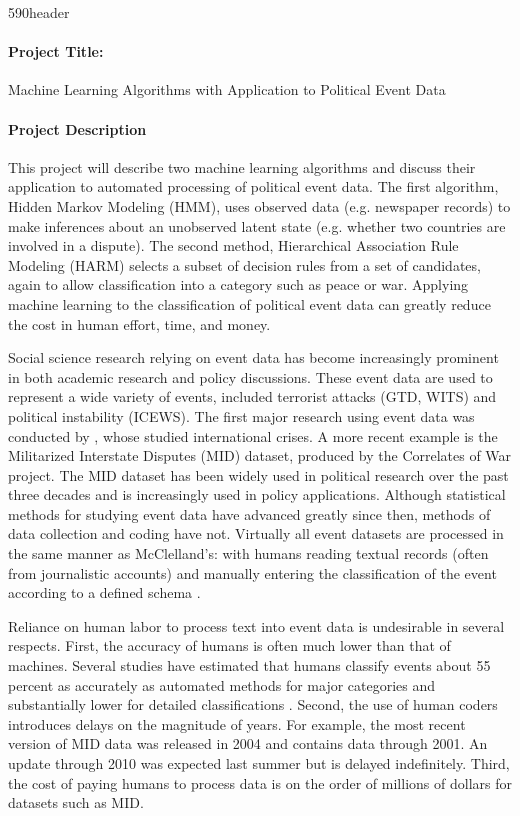 \documentclass[12pt,letterpaper]{article}
\begin{document}
\cps590header

\paragraph{Project Title:} Machine Learning Algorithms with Application to Political Event Data

\paragraph{Project Description} This project will describe two machine learning algorithms and discuss their application to automated processing of political event data. The first algorithm, Hidden Markov Modeling (HMM), uses observed data (e.g. newspaper records) to make inferences about an unobserved latent state (e.g. whether two countries are involved in a dispute). The second method, Hierarchical Association Rule Modeling (HARM) selects a subset of decision rules from a set of candidates, again to allow classification into a category such as peace or war. Applying machine learning to the classification of political event data can greatly reduce the cost in human effort, time, and money. 

Social science research relying on event data has become increasingly prominent in both academic research and policy discussions. These event data are used to represent a wide variety of events, included terrorist attacks (GTD, WITS) and political instability (ICEWS). The first major research using event data was conducted by \citet{mcclelland1961}, whose studied international crises. A more recent example is the Militarized Interstate Disputes (MID) dataset, produced by the Correlates of War project. The MID dataset has been widely used in political research over the past three decades and is increasingly used in policy applications. Although statistical methods for studying event data have advanced greatly since then, methods of data collection and coding have not. Virtually all event datasets are processed in the same manner as McClelland's: with humans reading textual records (often from journalistic accounts) and manually entering the classification of the event according to a defined schema \citep{gerner1994, grimmer2013}. 

Reliance on human labor to process text into event data is undesirable in several respects. First, the accuracy of humans is often much lower than that of machines. Several studies have estimated that humans classify events about 55 percent as accurately as automated methods for major categories \citep{king2003automated} and substantially lower for detailed classifications \citep{mikhaylov2012coder, ruggeri2011events}. Second, the use of human coders introduces delays on the magnitude of years. For example, the most recent version of MID data was released in 2004 and contains data through 2001. An update through 2010 was expected last summer but is delayed indefinitely. Third, the cost of paying humans to process data is on the order of millions of dollars for datasets such as MID. 
\end{document}
